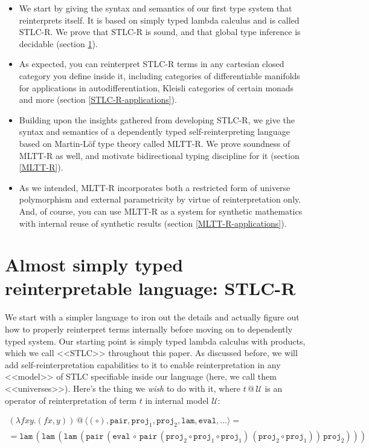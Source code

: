 \documentclass[acmsmall, review, screen, authorversion]{acmart}
\begin{document}
\begin{itemize}
    \item We start by giving the syntax and semantics of our first
        type system that reinterprets itself. It is based on simply
        typed lambda calculus and is called STLC-R. We prove that
        STLC-R is sound, and that global type inference is decidable
        (section \ref{STLC-R}).
    \item As expected, you can reinterpret STLC-R terms in any
        cartesian closed category you define inside it, including
        categories of differentiable manifolds for applications in
        autodifferentiation, Kleisli categories of certain monads and
        more (section \ref{STLC-R-applications}).
    \item Building upon the insights gathered from developing STLC-R,
        we give the syntax and semantics of a dependently typed
        self-reinterpreting language based on Martin-L\"of type
        theory called MLTT-R. We prove soundness of MLTT-R as well,
        and motivate bidirectional typing discipline for it (section
        \ref{MLTT-R}).
    \item As we intended, MLTT-R incorporates both a restricted form
        of universe polymorphism and external parametricity by virtue
        of reinterpretation only. And, of course, you can use MLTT-R
        as a system for synthetic mathematics with internal reuse of
        synthetic results (section \ref{MLTT-R-applications}).
\end{itemize}

\section{Almost simply typed reinterpretable language: STLC-R}
\label{STLC-R}

We start with a simpler language to iron out the details and actually
figure out how to properly reinterpret terms internally before moving
on to dependently typed system. Our starting point is simply typed
lambda calculus with products, which we call <<STLC>> throughout this
paper. As discussed before, we will add self-reinterpretation
capabilities to it to enable reinterpretation in any <<model>> of
STLC specifiable inside our language (here, we call them
<<universes>>). Here's the thing we \textit{wish} to do with it,
where $t\,@\,\mathcal{U}$ is an operator of reinterpretation of term
$t$ in internal model $\mathcal{U}$:

\begin{multline*}
    (\lambda f x y. (f x, y))\,@\,\langle
        (\circ),\mathtt{pair},\mathtt{proj}_1,\mathtt{proj}_2,
        \mathtt{lam},\mathtt{eval},\ldots
    \rangle=\\=
    \mathtt{lam}\,(\mathtt{lam}\,(\mathtt{lam}\,(\mathtt{pair}\,(
        \mathtt{eval}\,\circ\,\mathtt{pair}\,(
            \mathtt{proj}_2\circ\mathtt{proj}_1\circ\mathtt{proj}_1
        )\,(\mathtt{proj}_2\circ\mathtt{proj}_1)
    )\,\mathtt{proj}_2)))
\end{multline*}
\end{document}
